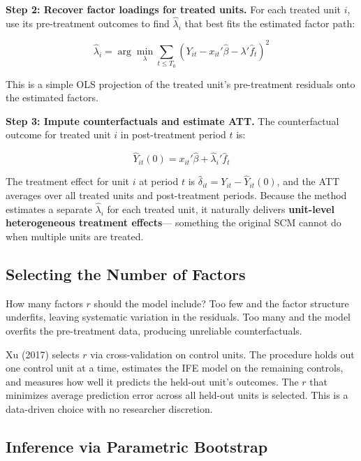 \documentclass[12pt]{article}
\begin{document}
\textbf{Step 2: Recover factor loadings for treated units.}
For each treated unit $i$, use its pre-treatment outcomes to find
$\hat{\lambda}_i$ that best fits the estimated factor path:

\begin{equation}
  \hat{\lambda}_i = \arg\min_{\lambda} \sum_{t \leq T_0}
  \left( Y_{it} - x_{it}'\hat{\beta} - \lambda' \hat{f}_t \right)^2
\end{equation}

This is a simple OLS projection of the treated unit's pre-treatment residuals
onto the estimated factors.

\textbf{Step 3: Impute counterfactuals and estimate ATT.}
The counterfactual outcome for treated unit $i$ in post-treatment period $t$ is:

\begin{equation}
  \hat{Y}_{it}(0) = x_{it}'\hat{\beta} + \hat{\lambda}_i' \hat{f}_t
\end{equation}

The treatment effect for unit $i$ at period $t$ is $\hat{\delta}_{it} = Y_{it} - \hat{Y}_{it}(0)$,
and the ATT averages over all treated units and post-treatment periods.
Because the method estimates a separate $\hat{\lambda}_i$ for each treated unit,
it naturally delivers \textbf{unit-level heterogeneous treatment effects}---
something the original SCM cannot do when multiple units are treated.

\subsection{Selecting the Number of Factors}

How many factors $r$ should the model include?
Too few and the factor structure underfits, leaving systematic variation in the residuals.
Too many and the model overfits the pre-treatment data, producing unreliable counterfactuals.

Xu (2017) selects $r$ via cross-validation on control units.
The procedure holds out one control unit at a time, estimates the IFE model
on the remaining controls, and measures how well it predicts the held-out unit's outcomes.
The $r$ that minimizes average prediction error across all held-out units is selected.
This is a data-driven choice with no researcher discretion.

\subsection{Inference via Parametric Bootstrap}
\end{document}
